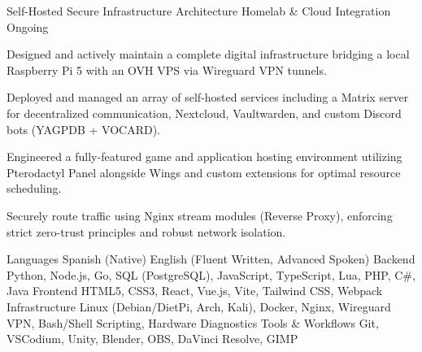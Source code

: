 \documentclass[11pt, a4paper]{awesome-cv}
\begin{document}
\begin{cventries}
  \cventry
    {Self-Hosted Secure Infrastructure Architecture} %
    {Homelab \& Cloud Integration} %
    {} %
    {Ongoing} %
    {
      \begin{cvitems} %
        \item {Designed and actively maintain a complete digital infrastructure bridging a local Raspberry Pi 5 with an OVH VPS via Wireguard VPN tunnels.}
        \item {Deployed and managed an array of self-hosted services including a Matrix server for decentralized communication, Nextcloud, Vaultwarden, and custom Discord bots (YAGPDB + VOCARD).}
        \item {Engineered a fully-featured game and application hosting environment utilizing Pterodactyl Panel alongside Wings and custom extensions for optimal resource scheduling.}
        \item {Securely route traffic using Nginx stream modules (Reverse Proxy), enforcing strict zero-trust principles and robust network isolation.}
      \end{cvitems}
    }
\end{cventries}


\begin{cvskills}
  \cvskill
    {Languages}
    {Spanish (Native) \enskip\cdotp\enskip English (Fluent Written, Advanced Spoken)}
  \cvskill
    {Backend}
    {Python, Node.js, Go, SQL (PostgreSQL), JavaScript, TypeScript, Lua, PHP, C\#, Java}
  \cvskill
    {Frontend}
    {HTML5, CSS3, React, Vue.js, Vite, Tailwind CSS, Webpack}
  \cvskill
    {Infrastructure}
    {Linux (Debian/DietPi, Arch, Kali), Docker, Nginx, Wireguard VPN, Bash/Shell Scripting, Hardware Diagnostics}
  \cvskill
    {Tools \& Workflows}
    {Git, VSCodium, Unity, Blender, OBS, DaVinci Resolve, GIMP}
\end{cvskills}
\end{document}
